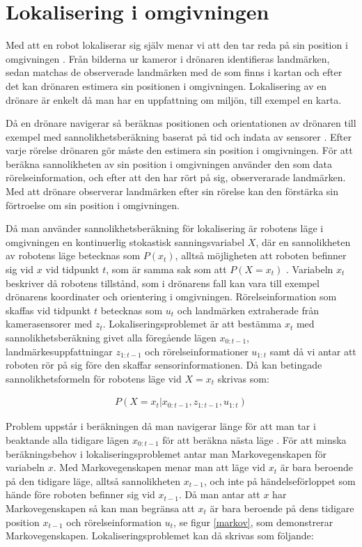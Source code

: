 \section{Lokalisering i omgivningen}

Med att en robot lokaliserar sig själv menar vi att den tar reda på sin position i omgivningen \citep{982903}. Från bilderna ur kameror i drönaren identifieras landmärken, sedan matchas de observerade landmärken med de som finns i kartan och efter det kan drönaren estimera sin positionen i omgivningen. Lokalisering av en drönare är enkelt då man har en uppfattning om miljön, till exempel en karta.

Då en drönare navigerar så beräknas positionen och orientationen av drönaren till exempel med sannolikhetsberäkning baserat på tid och indata av sensorer \citep{ProbabilisticRobotics}. Efter varje rörelse drönaren gör måste den estimera sin position i omgivningen. För att beräkna sannolikheten av sin position i omgivningen använder den som data rörelseinformation, och efter att den har rört på sig, observerarade landmärken. Med att drönare observerar landmärken efter sin rörelse kan den förstärka sin förtroelse om sin position i omgivningen. 

Då man använder sannolikhetsberäkning för lokalisering är robotens läge i omgivningen en kontinuerlig stokastisk sanningsvariabel $X$, där en sannolikheten av robotens läge betecknas som $P(x_t)$, alltså möjligheten att roboten befinner sig vid $x$ vid tidpunkt $t$, som är samma sak som att $P(X = x_t)$ \citep{ProbabilisticRobotics}. Variabeln $x_t$ beskriver då robotens tillstånd, som i drönarens fall kan vara till exempel drönarens koordinater och orientering i omgivningen. Rörelseinformation som skaffas vid tidpunkt $t$ betecknas som $u_t$ och landmärken extraherade från kamerasensorer med $z_t$. Lokaliseringsproblemet är att bestämma $x_t$ med sannolikhetsberäkning givet alla föregående lägen $x_{0:t-1}$, landmärkesuppfattningar $z_{1:t-1}$ och rörelseinformationer $u_{1:t}$ samt då vi antar att roboten rör på sig före den skaffar sensorinformationen. Då kan betingade sannolikhetsformeln för robotens läge vid $X = x_t$ skrivas som:

\begin{align}
    P( X = x_t | x_{0:t-1}, z_{1:t-1}, u_{1:t})
\end{align}

Problem uppstår i beräkningen då man navigerar länge för att man tar i beaktande alla tidigare lägen $x_{0:t-1}$ för att beräkna nästa läge \citep{ProbabilisticRobotics}. För att minska beräkningsbehov i lokaliseringsproblemet antar man Markovegenskapen för variabeln $x$. Med Markovegenskapen menar man att läge vid $x_t$ är bara beroende på den tidigare läge, alltså sannolikheten $x_{t-1}$, och inte på händelseförloppet som hände före roboten befinner sig vid $x_{t-1}$. Då man antar att $x$ har Markovegenskapen så kan man begränsa att $x_t$ är bara beroende på dens tidigare position $x_{t-1}$ och rörelseinformation $u_t$, se figur \ref{markov}, som demonstrerar Markovegenskapen. Lokaliseringsproblemet kan då skrivas som följande:

